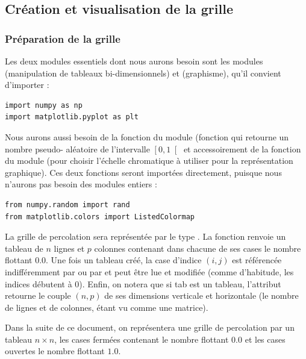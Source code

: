 \subsection{Création et visualisation de la grille}\label{cruxe9ation-et-visualisation-de-la-grille}

\subsubsection{Préparation de la grille}

Les deux modules essentiels dont nous aurons besoin sont les modules
 (manipulation de tableaux bi-dimensionnels) et 
(graphisme), qu'il convient d'importer :

\begin{lstlisting}
import numpy as np
import matplotlib.pyplot as plt
\end{lstlisting}

Nous aurons aussi besoin de la fonction \textbf{} du module 
(fonction qui retourne un nombre pseudo- aléatoire de l'intervalle
$\left[0,1\right[$ et accessoirement de la fonction  du
module  (pour choisir l'échelle chromatique à utiliser
pour la représentation graphique). Ces deux fonctions seront importées
directement, puisque nous n'aurons pas besoin des modules entiers :

\begin{lstlisting}
from numpy.random import rand
from matplotlib.colors import ListedColormap
\end{lstlisting}

La grille de percolation sera représentée par le type . La
fonction  renvoie un tableau de $n$ lignes et
$p$ colonnes contenant dans chacune de ses cases le nombre flottant
0.0. Une fois un tableau  créé, la case d'indice $(i, j)$ est
référencée indifféremment par  ou par  et
peut être lue et modifiée (comme d'habitude, les indices débutent à 0).
Enfin, on notera que si tab est un tableau, l'attribut 
retourne le couple $(n, p)$ de ses dimensions verticale et
horizontale (le nombre de lignes et de colonnes,  étant vu comme une
matrice).

Dans la suite de ce document, on représentera une grille de percolation
par un tableau $n\times n$, les cases fermées contenant le nombre
flottant $0.0$ et les cases ouvertes le nombre flottant $1.0$.

